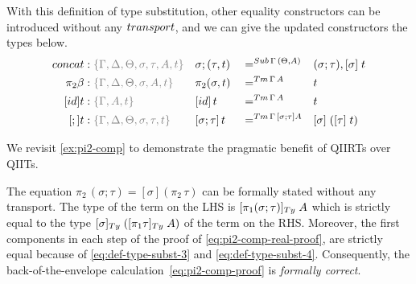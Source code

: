 \documentclass[a4paper,UKenglish,numberwithinsect,cleveref,thm-restate]{lipics-v2021}
\begin{document}
With this definition of type substitution, other equality constructors can be introduced without any $\transp$, and we can give the updated constructors the types below.
\begin{alignat*}{5}
  \mathsf{concat} & : \implicit{\Gamma, \Delta, \Theta, \sigma, \tau, A, t} &&\sigma ; (\tau , t) && =^{\Sub\,\Gamma\,(\Theta, A)} &&  (\sigma ; \tau), [ \sigma ]\;t \\
  \pi_2\beta      & : \implicit{\Gamma, \Delta, \Theta, \sigma, A, t} && \pi_2(\sigma , t)        && =^{\Tm\,\Gamma\, A} &&  t \\
  [\idS]t         & : \implicit{\Gamma, A, t} && {[\idS]\,t}          && =^{\Tm\,\Gamma\,A} && t \\
  [;]t            & : \implicit{\Gamma, \Delta, \Theta, \sigma, \tau, t} && {[\sigma ; \tau]\,t} && =^{\Tm\,\Gamma\,[\sigma ; \tau] A} && {[ \sigma ]\;([ \tau ]\;t})
\end{alignat*}

We revisit \cref{ex:pi2-comp} to demonstrate the pragmatic benefit of QIIRTs over QIITs.
\begin{example}
  The equation $\pi_2\,(\sigma; \tau) = [\sigma](\pi_2\,\tau)$ can be formally stated without any transport.
  The type of the term on the LHS is $[\pi_1(\sigma;\tau)]_{\Ty}\;A$ which is strictly equal to the type $[\sigma]_\Ty\;([\pi_1\tau]_\Ty\;A)$ of the term on the RHS.
  Moreover, the first components in each step of the proof of \eqref{eq:pi2-comp-real-proof}, are strictly equal because of \eqref{eq:def-type-subst-3} and \eqref{eq:def-type-subst-4}.
  Consequently, the back-of-the-envelope calculation~\eqref{eq:pi2-comp-proof} is \emph{formally correct}.
\end{example}
\end{document}
